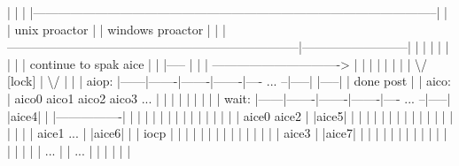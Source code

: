 \begin{DoxyPre}
                                                               |                          |                                               |
      |--------------------------------------------------------------------------------------------------|                                |
      |                         unix proactor                  |              |     windows proactor     |                                |
      |-----------------------------------------------------------------------|--------------------------|                                |
      |                                                        |              |           |              |                                |
      |                           continue to spak aice        |              |           |-----         |                                |
      |                      ------------------------------->  |              |           |     |        |                                |
      |                     |                                 \textbackslash{}/    [lock]    |          \textbackslash{}/     |        |                                |
aiop: |------|-------|-------|-------|---- ... --|-----|    |-----|           |         done  post       |                                |
aico: | aico0  aico1   aico2   aico3       ...         |    |  |  |           |          |      |        |                                |
wait: |------|-------|-------|-------|---- ... --|-----|    |aice4|           |    |----------------|    |                                |
      |   |              |                             |    |  |  |           |    |                |    |                                |
      | aice0           aice2                          |    |aice5|           |    |                |    |                                |
      |   |              |                             |    |  |  |           |    |                |    |                                |
      | aice1           ...                            |    |aice6|           |    |      iocp      |    |                                |
      |   |                                            |    |  |  |           |    |                |    |                                |
      | aice3                                          |    |aice7|           |    |                |    |                                |
      |   |                                            |    |  |  |           |    |                |    |                                |
      |  ...                                           |    | ... |           |    |                |    |                                |

\end{DoxyPre}
